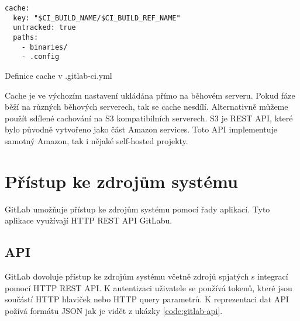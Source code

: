 \begin{listing}[ht]
\begin{verbatim}
cache:
  key: "$CI_BUILD_NAME/$CI_BUILD_REF_NAME"
  untracked: true
  paths:
    - binaries/
    - .config
\end{verbatim}
\caption{Definice cache v .gitlab-ci.yml}
\end{listing}
 
Cache je ve výchozím nastavení ukládána přímo na běhovém serveru.
Pokud fáze běží na různých běhových serverech, tak se cache nesdílí.
Alternativně můžeme použít sdílené cachování na S3 kompatibilních serverech.
S3 je REST API, které bylo původně vytvořeno jako část Amazon services.
Toto API implementuje samotný Amazon, tak i nějaké self-hosted projekty.


\section{Přístup ke zdrojům systému}

GitLab umožňuje přístup ke zdrojům systému pomocí řady aplikací.
Tyto aplikace využívají HTTP REST API GitLabu. 

\subsection{API}

GitLab dovoluje přístup ke zdrojům systému včetně zdrojů spjatých s integrací pomocí HTTP REST API.
K autentizaci uživatele se používá tokenů, které jsou součástí HTTP hlaviček nebo HTTP query parametrů.
K reprezentaci dat API požívá formátu JSON jak je vidět z ukázky \ref{code:gitlab-api}.

